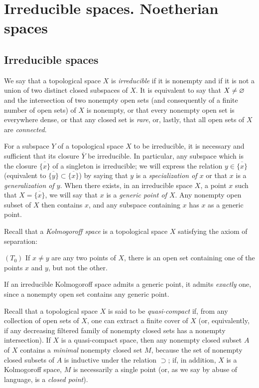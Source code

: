 \section{Irreducible spaces. Noetherian spaces}
\label{section-irreducible-and-noetherian-spaces}

\subsection{Irreducible spaces}
\label{subsection-irreducible-spaces}

\begin{env}[2.1.1]
\label{0.2.1.1}
We say that a topological space $X$ is \emph{irreducible} if it is nonempty and if it is not a union of two distinct closed subspaces of $X$.
It is equivalent to say that $X\neq\varnothing$ and the intersection of two nonempty open sets (and consequently of a finite number of open sets) of $X$ is nonempty, or that every nonempty open set is everywhere dense, or that any closed set is \emph{rare}, or, lastly, that all open sets of $X$ are \emph{connected}.
\end{env}

\begin{env}[2.1.2]
\label{0.2.1.2}
For a subspace $Y$ of a topological space $X$ to be irreducible, it is necessary and sufficient that its closure $\overline{Y}$ be irreducible.
In particular, any subspace which is the closure $\overline{\{x\}}$ of a singleton is irreducible; we will express the relation $y\in\overline{\{x\}}$ (equivalent to $\overline{\{y\}}\subset\overline{\{x\}}$) by saying that $y$ is a \emph{specialization of $x$} or that $x$ is a \emph{generalization of $y$}.
When there exists, in an irreducible space $X$, a point $x$ such that $X=\overline{\{x\}}$, we will say that $x$ is a \emph{generic point of $X$}.
Any nonempty open subset of $X$ then contains $x$, and any subspace containing $x$ has $x$ as a generic point.
\end{env}

\begin{env}[2.1.3]
\label{0.2.1.3}
Recall that a \emph{Kolmogoroff space} is a topological space $X$ satisfying the axiom of separation:

$(T_0)$ If $x\neq y$ are any two points of $X$, there is an open set containing one of the points $x$ and $y$, but not the other.

If an irreducible Kolmogoroff space admits a generic point, it admits \emph{exactly} one, since a nonempty open set contains any generic point.

Recall that a topological space $X$ is said to be \emph{quasi-compact} if, from any collection of open sets of $X$, one can extract a finite cover of $X$ (or, equivalently, if any decreasing filtered family of nonempty closed sets has a nonempty intersection).
If $X$ is a quasi-compact space, then any nonempty closed subset $A$ of $X$ contains a \emph{minimal} nonempty closed set $M$, because the set of nonempty closed subsets of $A$ is inductive under the relation $\supset$; if, in addition, $X$ is a Kolmogoroff space, $M$ is necessarily a single point (or, as we say by abuse of language, is a \emph{closed point}).
\end{env}

